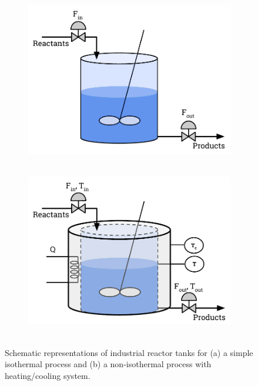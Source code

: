 \documentclass[a4paper,11pt]{book}
\numberwithin{figure}{chapter}
\numberwithin{equation}{chapter}
\numberwithin{table}{chapter}
\theoremstyle{definition}
\begin{document}
\begin{figure}[ht] 
    \centering
    \begin{subfigure}{0.49\textwidth}   
        \includegraphics[width=\textwidth]{chapter2/tank01}
        \caption{$\ \ \ \ \ $}  \label{fig:tank01a}
    \end{subfigure}
    \begin{subfigure}{0.49\textwidth}   
        \includegraphics[width=\textwidth]{chapter2/tank02}
        \caption{$\ \ \ \ \ $} \label{fig:tank01b}
    \end{subfigure}
    
    \caption{Schematic representations of industrial reactor tanks for (a) a simple isothermal process and (b) a non-isothermal process with heating/cooling system.} 
    \label{fig:tank01}
\end{figure}
\end{document}
